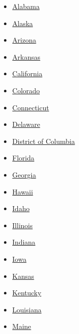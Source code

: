 \begin{itemize}
\tightlist
\item
  \href{https://www.nytimes3xbfgragh.onion/elections/results/alabama}{Alabama}
\item
  \href{https://www.nytimes3xbfgragh.onion/elections/results/alaska}{Alaska}
\item
  \href{https://www.nytimes3xbfgragh.onion/elections/results/arizona}{Arizona}
\item
  \href{https://www.nytimes3xbfgragh.onion/elections/results/arkansas}{Arkansas}
\item
  \href{https://www.nytimes3xbfgragh.onion/elections/results/california}{California}
\item
  \href{https://www.nytimes3xbfgragh.onion/elections/results/colorado}{Colorado}
\item
  \href{https://www.nytimes3xbfgragh.onion/elections/results/connecticut}{Connecticut}
\item
  \href{https://www.nytimes3xbfgragh.onion/elections/results/delaware}{Delaware}
\item
  \href{https://www.nytimes3xbfgragh.onion/elections/results/district-of-columbia}{District
  of Columbia}
\item
  \href{https://www.nytimes3xbfgragh.onion/elections/results/florida}{Florida}
\item
  \href{https://www.nytimes3xbfgragh.onion/elections/results/georgia}{Georgia}
\item
  \href{https://www.nytimes3xbfgragh.onion/elections/results/hawaii}{Hawaii}
\item
  \href{https://www.nytimes3xbfgragh.onion/elections/results/idaho}{Idaho}
\item
  \href{https://www.nytimes3xbfgragh.onion/elections/results/illinois}{Illinois}
\item
  \href{https://www.nytimes3xbfgragh.onion/elections/results/indiana}{Indiana}
\item
  \href{https://www.nytimes3xbfgragh.onion/elections/results/iowa}{Iowa}
\item
  \href{https://www.nytimes3xbfgragh.onion/elections/results/kansas}{Kansas}
\item
  \href{https://www.nytimes3xbfgragh.onion/elections/results/kentucky}{Kentucky}
\item
  \href{https://www.nytimes3xbfgragh.onion/elections/results/louisiana}{Louisiana}
\item
  \href{https://www.nytimes3xbfgragh.onion/elections/results/maine}{Maine}

\end{itemize}
